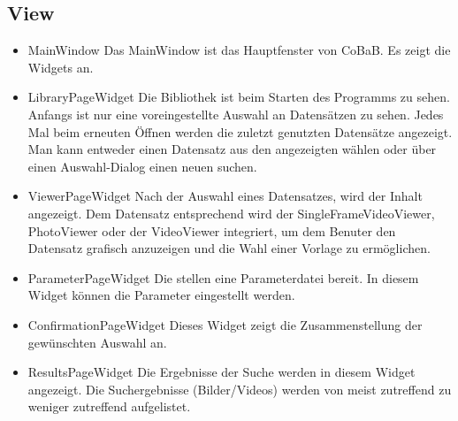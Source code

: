 \subsection*{View}
\begin{itemize}
\item MainWindow \newline
Das MainWindow ist das Hauptfenster von CoBaB. Es zeigt die Widgets an.

\item LibraryPageWidget \newline
Die Bibliothek ist beim Starten des Programms zu sehen. Anfangs ist nur eine voreingestellte Auswahl an Datensätzen zu sehen. Jedes Mal beim erneuten Öffnen werden die zuletzt genutzten Datensätze angezeigt. Man kann entweder einen Datensatz aus den angezeigten wählen oder über einen Auswahl-Dialog einen neuen suchen.
\pagebreak
\item ViewerPageWidget \newline
Nach der Auswahl eines Datensatzes, wird der Inhalt angezeigt. Dem Datensatz entsprechend wird der SingleFrameVideoViewer, PhotoViewer oder der VideoViewer integriert, um dem Benuter den Datensatz grafisch anzuzeigen und die Wahl einer Vorlage zu ermöglichen.

\item ParameterPageWidget \newline
Die  stellen eine Parameterdatei bereit. In diesem Widget können die Parameter eingestellt werden.

\item ConfirmationPageWidget \newline 
Dieses Widget zeigt die Zusammenstellung der gewünschten Auswahl an.

\item ResultsPageWidget \newline
Die Ergebnisse der Suche werden in diesem Widget angezeigt. Die Suchergebnisse (Bilder/Videos) werden von meist zutreffend zu weniger zutreffend aufgelistet. 

\end{itemize}
